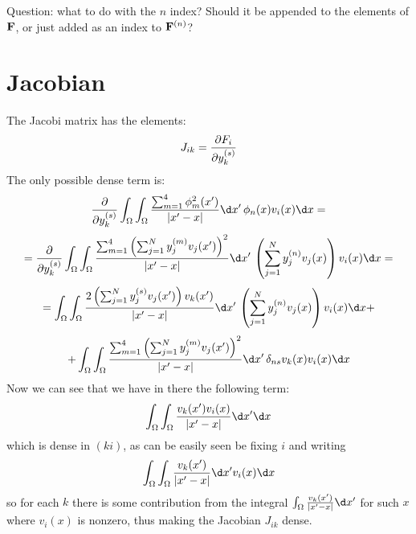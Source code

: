 \documentclass[11pt]{article}
\begin{document}
Question: what to do with the $n$ index? Should it be appended to the elements
of ${\bf F}$, or just added as an index to ${\bf F}^{(n)}$?

\section{Jacobian}

The Jacobi matrix has the elements:
$$J_{ik} = {\partial F_i\over\partial y_k^{(s)}}$$
The only possible dense term is:
$$
{\partial\over\partial y_k^{(s)}}\int_\Omega \int_\Omega {
\sum_{m=1}^4 \phi_m^2(x')
\over|x' - x|}\d x'\,\phi_n(x) v_i(x) \d x =
$$
$$
=
{\partial\over\partial y_k^{(s)}}\int_\Omega \int_\Omega {
\sum_{m=1}^4 \left(\sum_{j=1}^N y_j^{(m)} v_j(x')\right)^2
\over|x' - x|}\d x'\, \left(\sum_{j=1}^N y_j^{(n)} v_j(x)\right)  v_i(x) \d x =
$$
$$
=
\int_\Omega \int_\Omega {
2 \left(\sum_{j=1}^N y_j^{(s)} v_j(x')\right)v_k(x')
\over|x' - x|}\d x'\, \left(\sum_{j=1}^N y_j^{(n)} v_j(x)\right)  v_i(x) \d x +
$$
$$+
\int_\Omega \int_\Omega {
\sum_{m=1}^4 \left(\sum_{j=1}^N y_j^{(m)} v_j(x')\right)^2
\over|x' - x|}\d x'\, \delta_{ns}v_k(x)  v_i(x) \d x
$$
Now we can see that we have in there the following term:
$$
\int_\Omega \int_\Omega {v_k(x') v_i(x)\over |x'-x|}\d x'\d x
$$
which is dense in $(ki)$, as can be easily seen be fixing $i$ and writing
$$
\int_\Omega \int_\Omega {v_k(x')\over |x'-x|}\d x' v_i(x)\d x
$$
so for each $k$ there is some contribution from the integral $ \int_\Omega
{v_k(x')\over |x'-x|}\d x' $ for such $x$ where $v_i(x)$ is nonzero, thus
making the Jacobian $J_{ik}$ dense.
\end{document}
